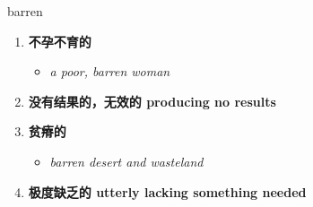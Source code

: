 
\begin{frame}
{\huge barren}
\begin{center}
\begin{enumerate}\Large
  \item \textbf{不孕不育的}
  \begin{itemize}
    \item \em{\Large{a poor, barren woman}}
  \end{itemize}
  \item \textbf{没有结果的，无效的 producing no results}
  \item \textbf{贫瘠的}
  \begin{itemize}
    \item \em{\Large{barren desert and wasteland}}
  \end{itemize}
  \item \textbf{极度缺乏的 utterly lacking something needed}
\end{enumerate}
\end{center}
\end{frame}

